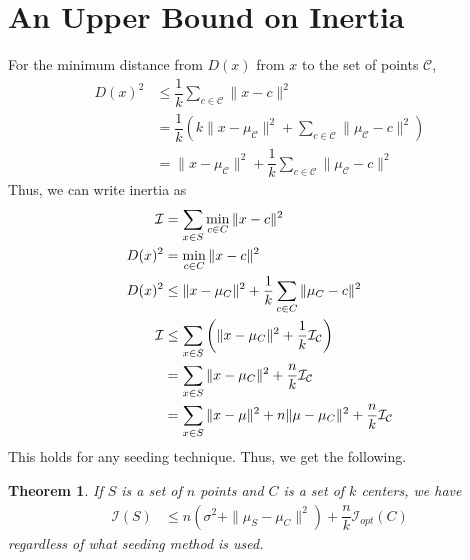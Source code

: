 \documentclass[12pt]{article}
\newtheorem{theorem}{Theorem}
\newcommand{\X}{\mathbf{X}}
\newcommand{\C}{\mathcal{C}}
\newcommand{\I}{\mathcal{I}}
\begin{document}
	\section{An Upper Bound on Inertia}
	For the minimum distance from $D(x)$ from $x$ to the set of points $\C$,
		\begin{align*}
			D(x)^2 & \leq \dfrac{1}{k}\sum_{c\in \C}\|x-c\|^2\\
					& = \dfrac{1}{k}\left(k\|x-\mu_{\C}\|^2+\sum_{c\in\C}\|\mu_{\C}-c\|^2\right)\\
					& = \|x-\mu_{\C}\|^2+\dfrac{1}{k}\sum_{c\in\C}\|\mu_{\C}-c\|^2
		\end{align*}
	Thus, we can write inertia as
		\begin{align*}
			\cal I & = \sum_{x\in S}\min_{c\in C}\|x-c\|^2\\
			D(x)^2 & = \min_{c\in C}\|x-c\|^2\\
			D(x)^2 & \leq \|x-\mu_{C}\|^2+\dfrac{1}{k}\sum_{c\in C}\|\mu_{C}-c\|^2\\
			\cal I & \leq \sum_{x\in S}\left(\|x-\mu_C\|^2+\dfrac1k\cal I_C\right)\\
			& = \sum_{x\in S}\|x-\mu_C\|^2+\dfrac nk\cal I_C\\
			& = \sum_{x\in S}\|x-\mu\|^2+n\|\mu-\mu_C\|^2+\dfrac nk\cal I_C
		\end{align*}
	This holds for any seeding technique. Thus, we get the following.
		\begin{theorem}
			If $S$ is a set of $n$ points and $C$ is a set of $k$ centers, we have
				\begin{align*}
					\I(S) & \leq n(\sigma^2+\|\mu_S-\mu_C\|^2)+\dfrac{n}{k}\I_{opt}(C)
				\end{align*}
			regardless of what seeding method is used.
		\end{theorem}
\end{document}
